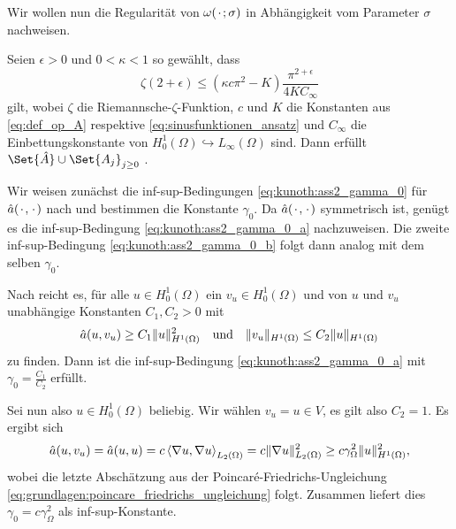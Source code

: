 Wir wollen nun die Regularität von $\omega({\mkern2mu\cdot\mkern2mu}; \sigma)$ in Abhängigkeit vom Parameter $\sigma$ nachweisen.

\begin{Satz}
\label{satz:regularitaet_nachrechnen}
    Seien $\epsilon > 0$ und $0 < \kappa < 1$ so gewählt, dass
    \begin{equation}
        \zeta(2 + \epsilon) \leq (\kappa c \pi^{2} - K) \frac{\pi^{2+\epsilon}}{4K C_{\infty}}
    \end{equation}
    gilt,
    wobei $\zeta$ die Riemannsche-$\zeta$-Funktion, $c$ und $K$ die Konstanten aus \eqref{eq:def_op_A} respektive \eqref{eq:sinusfunktionen_ansatz} und $C_{\infty}$ die Einbettungskonstante von $H^{1}_{0}(\Omega) \hookrightarrow L_{\infty}(\Omega)$ sind.
    Dann erfüllt $\Set{\hat A} \cup \Set{ A_{j} }_{j \geq 0}$ .

    \begin{Beweis}
        Wir weisen zunächst die inf-sup-Bedingungen \eqref{eq:kunoth:ass2_gamma_0} für $\hat a({\mkern2mu\cdot\mkern2mu}, {\mkern2mu\cdot\mkern2mu})$ nach und bestimmen die Konstante $\gamma_{0}$.
        Da $\hat a({\mkern2mu\cdot\mkern2mu}, {\mkern2mu\cdot\mkern2mu})$ symmetrisch ist, genügt es die inf-sup-Bedingung \eqref{eq:kunoth:ass2_gamma_0_a} nachzuweisen. Die zweite inf-sup-Bedingung \eqref{eq:kunoth:ass2_gamma_0_b} folgt dann analog mit dem selben $\gamma_{0}$.

        Nach  reicht es, für alle $u \in H^{1}_{0}(\Omega)$ ein $v_{u} \in H^{1}_{0}(\Omega)$ und von $u$ und $v_{u}$ unabhängige Konstanten $C_{1}, C_{2} > 0$ mit
        \begin{equation}
            \hat a(u, v_{u}) \geq C_{1} \lVert u\rVert_{H^{1}(\Omega)}^{2} \quad \text{und} \quad \lVert v_{u}\rVert_{H^{1}(\Omega)} \leq C_{2} \lVert u\rVert_{H^{1}(\Omega)}
        \end{equation}
        zu finden.
        Dann ist die inf-sup-Bedingung \eqref{eq:kunoth:ass2_gamma_0_a} mit $\gamma_{0} = \frac{C_{1}}{C_{2}}$ erfüllt.

        Sei nun also $u \in H^{1}_{0}(\Omega)$ beliebig.
        Wir wählen $v_{u} = u \in V$, es gilt also $C_{2} = 1$.
        Es ergibt sich
        \begin{align}
            \hat a(u, v_{u}) = \hat a(u, u) = c \left\langle\nabla u,\nabla u\right\rangle_{L_{2}(\Omega)} = c \lVert\nabla u\rVert_{L_{2}(\Omega)}^{2} \geq c \gamma_{\Omega}^{2} \lVert u\rVert_{H^{1}(\Omega)}^{2},
        \end{align}
        wobei die letzte Abschätzung aus der Poincaré-Friedrichs-Ungleichung \eqref{eq:grundlagen:poincare_friedrichs_ungleichung} folgt.
        Zusammen liefert dies $\gamma_{0} = c \gamma_{\Omega}^{2}$ als inf-sup-Konstante.


\end{Beweis}
\end{Satz}

